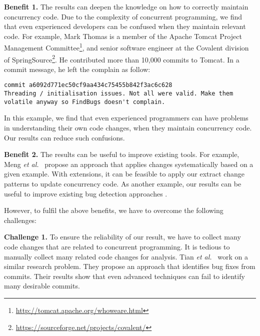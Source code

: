 \noindent
\textbf{Benefit 1.} The results can deepen the knowledge on how to correctly maintain concurrency code. Due to the complexity of concurrent programming, we find that even experienced developers can be confused when they maintain relevant code. For example, Mark Thomas is a member of the Apache Tomcat Project Management Committee\footnote{\url{http://tomcat.apache.org/whoweare.html}}, and senior software engineer at the Covalent division of SpringSource\footnote{\url{https://sourceforge.net/projects/covalent/}}. He contributed more than 10,000 commits to Tomcat. In a commit message, he left the complain as follow:

\lstset{numbers=left, breaklines=true,  basicstyle=\ttfamily\tiny,  xleftmargin=3em, tabsize=2}
\begin{lstlisting}
commit a6092d771ec50cf9aa434c75455b842f3ac6c628
Threading / initialisation issues. Not all were valid. Make them volatile anyway so FindBugs doesn't complain.
\end{lstlisting}

\noindent
In this example, we find that even experienced programmers can have problems in understanding their own code changes, when they maintain concurrency code. Our results can reduce such confusions.


\noindent
\textbf{Benefit 2.} The results can be useful to improve existing tools. For example, Meng \emph{et al.}~\cite{conf/pldi/MengKM11} propose an approach that applies changes systematically based on a given example. With extensions, it can be feasible to apply our extract change patterns to update concurrency code. As another example, our results can be useful to improve existing bug detection approaches \cite{conf/ppopp/SamakR14, conf/sigsoft/EslamimehrP14}.

However, to fulfil the above benefits, we have to overcome the following challenges:

\noindent
\textbf{Challenge 1.} To ensure the reliability of our result, we have to collect many code changes that are related to concurrent programming. It is tedious to manually collect many related code changes for analysis. Tian \emph{et al.}~\cite{tian2012identifying} work on a similar research problem. They propose an approach that identifies bug fixes from commits. Their results show that even advanced techniques can fail to identify many desirable commits.


